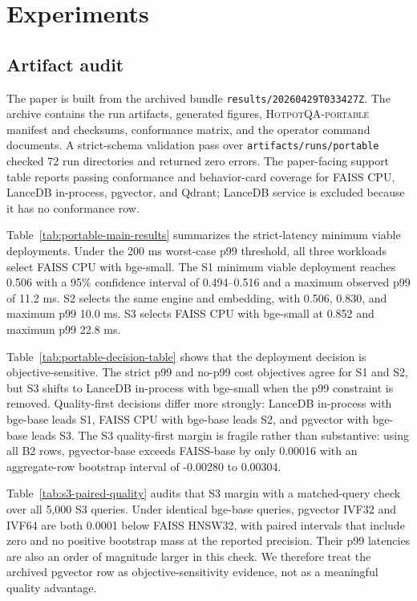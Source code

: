 \section{Experiments}

\subsection{Artifact audit}

The paper is built from the archived bundle \texttt{results/20260429T033427Z}. The archive contains the run artifacts, generated figures, \textsc{HotpotQA-portable} manifest and checksums, conformance matrix, and the operator command documents. A strict-schema validation pass over \texttt{artifacts/runs/portable} checked 72 run directories and returned zero errors. The paper-facing support table reports passing conformance and behavior-card coverage for FAISS CPU, LanceDB in-process, pgvector, and Qdrant; LanceDB service is excluded because it has no conformance row.



Table~\ref{tab:portable-main-results} summarizes the strict-latency minimum viable deployments. Under the 200 ms worst-case p99 threshold, all three workloads select FAISS CPU with bge-small. The S1 minimum viable deployment reaches \ndcg{} 0.506 with a 95\% confidence interval of 0.494--0.516 and a maximum observed p99 of 11.2 ms. S2 selects the same engine and embedding, with \ndcg{} 0.506, \freshfive{} 0.830, and maximum p99 10.0 ms. S3 selects FAISS CPU with bge-small at \ecov{} 0.852 and maximum p99 22.8 ms.



Table~\ref{tab:portable-decision-table} shows that the deployment decision is objective-sensitive. The strict p99 and no-p99 cost objectives agree for S1 and S2, but S3 shifts to LanceDB in-process with bge-small when the p99 constraint is removed. Quality-first decisions differ more strongly: LanceDB in-process with bge-base leads S1, FAISS CPU with bge-base leads S2, and pgvector with bge-base leads S3. The S3 quality-first margin is fragile rather than substantive: using all B2 rows, pgvector-base exceeds FAISS-base by only 0.00016 \ecov{} with an aggregate-row bootstrap interval of -0.00280 to 0.00304.



Table~\ref{tab:s3-paired-quality} audits that S3 margin with a matched-query check over all 5{,}000 S3 queries. Under identical bge-base queries, pgvector IVF32 and IVF64 are both 0.0001 \ecov{} below FAISS HNSW32, with paired intervals that include zero and no positive bootstrap mass at the reported precision. Their p99 latencies are also an order of magnitude larger in this check. We therefore treat the archived pgvector row as objective-sensitivity evidence, not as a meaningful quality advantage.


